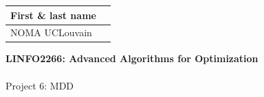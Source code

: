 \documentclass[12pt]{report}
\newcommand{\answerbox}[2]{\hfill\break\\
        \framebox[\linewidth]{\parbox[c][#1][c]{\dimexpr\linewidth-2\fboxsep-2\fboxrule}{#2}}
}
\begin{document}
\hfill
\begingroup
\Large
\begin{tabular}{|l|p{6cm}|}
	\hline
	First \& last name &
	\\ \hline
	NOMA UCLouvain & 
	\\ \hline
\end{tabular}
\endgroup
\vspace{1.5cm}

\noindent
\begingroup
	\Large
	\textbf{LINFO2266: Advanced Algorithms for Optimization}\\\\
	Project 6: MDD
\endgroup
\vspace{0.2cm}

%
%
%
%
%
\end{document}
